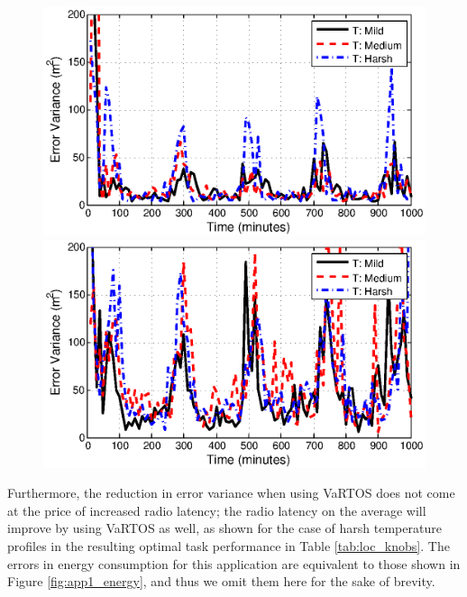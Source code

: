 \begin{figure}[t]
\centering
{\centering
\begin{minipage}{0.47\textwidth}
  \centering
\includegraphics[width=\textwidth]{figures/localization_variance_var}
\end{minipage}
\hspace{.04\textwidth}
\begin{minipage}{0.47\textwidth}
  \centering
\includegraphics[width=\textwidth]{figures/localization_variance_novar}
\end{minipage}
}
\end{figure}



Furthermore, the reduction in error variance when using VaRTOS does not come at the price of increased radio latency; the radio latency on the average will improve by using VaRTOS as well, as shown  for the case of harsh temperature profiles in the resulting optimal task performance in Table \ref{tab:loc_knobs}. The errors in energy consumption for this application are equivalent to those shown in Figure \ref{fig:app1_energy}, and thus we omit them here for the sake of brevity.


